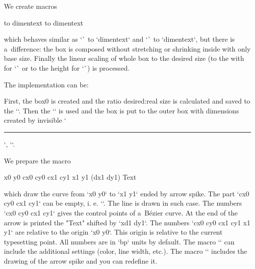 We create macros 

\begtt
\shbox to dimen{text} 
\svbox to dimen{text} 
\endtt


which behaves similar as `\hbox` to `dimen{text}` and `\vbox` to `dimen{text}`, but there is a~difference: the box is composed without stretching or shrinking inside with only base size. Finally the linear scaling of whole box to the desired size (to the with for `\hbox` or to the height for `\vbox`) is processed. 



The implementation can be: 

\begtt
\def\shbox to#1#{\sboxA\hbox\wd{#1}} 
\def\svbox to#1#{\sboxA\vbox\ht{#1}} 
\def\sboxA#1#2#3#4{#1to#3{%
   \setbox0=#1{#4}\tmpdim=#3\relax \tmpnum=#20 
   \divide\tmpnum by256 \divide\tmpdim by\tmpnum \multiply\tmpdim by256 
   \edef\tmp{\expandafter\ignorept\the\tmpdim}%
   \ifx#1\hbox \vrule height\tmp\ht0 depth\tmp\dp0 width0pt 
   \else \hrule width\tmp\wd0 height0pt \tmpdim=\dp0 \fi 
   \ht0=0pt \dp0=0pt \wd0=0pt \pdfsave\pdfscale{\tmp}{\tmp}\box0\pdfrestore 
   \ifx#1\hbox\hfil 
   \else \vfil \hrule height0pt width0pt depth\tmp\tmpdim \fi}%
} 
\endtt


First, the box0 is created and the ratio desired:real size is calculated and saved to the `\tmp`. Then the `\pdfscale` is used and the box is put to the outer box with dimensions created by invisible `\hrule`, `\vrule`. 


 


We prepare the macro 

\begtt
\arrowcc x0 y0 {cx0 cy0 cx1 cy1} x1 y1 (dx1 dy1) {Text} 
\endtt


which draw the curve from `x0 y0` to `x1 y1` ended by arrow spike. The part `{cx0 cy0 cx1 cy1}` can be empty, i. e. `{}`. The line is drawn in such case. The numbers `{cx0 cy0 cx1 cy1}` gives the control points of a~Bézier curve. At the end of the arrow is printed the "Text" shifted by `xd1 dy1`. The numbers `cx0 cy0 cx1 cy1 x1 y1` are relative to the origin `x0 y0`. This origin is relative to the current typesetting point. All numbers are in `bp` units by default. The macro `\arrowccparams` can include the additional settings (color, line width, etc.). The macro `\arrowccspike` includes the drawing of the arrow spike and you can redefine it. 

\begtt
{} 
\def\arrowccparams{1 0 0 rg 1 0 0 RG}  %
 
